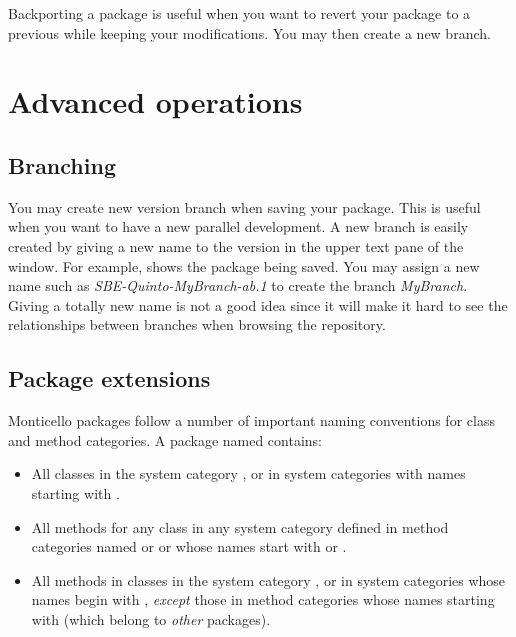 \documentclass[a4paper,10pt,twoside]{book}
\begin{document}
Backporting a package is useful when you want to revert your package to a previous while keeping your modifications. You may then create a new branch.


\section{Advanced operations}

\subsection{Branching}

You may create new version branch when saving your package. This is useful when you want to have a new parallel development. A new branch is easily created by giving a new name to the version in the upper text pane of the  window. For example,  shows the package  being saved. You may assign a new name such as \emph{SBE-Quinto-MyBranch-ab.1} to create the branch \emph{MyBranch}. Giving a totally new name is not a good idea since it will make it hard to see the relationships between branches when browsing the repository.

\subsection{Package extensions}
Monticello packages follow a number of important naming conventions for class and method categories.
A package named  contains:

\begin{itemize}
\item All classes in the system category , or in system categories with names starting with .
\item All methods for any class in any system category defined in method categories named  or  or whose names start with  or .
\item All methods in classes in the system category , or in system categories whose names begin with , \emph{except} those in method categories whose names starting with \prot{*} (\ie which belong to \emph{other} packages).
\end{itemize}
\end{document}
